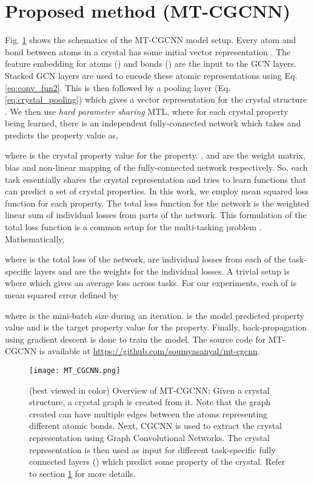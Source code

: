\documentclass{article}
\newcommand{\method}[1]{MT-CGCNN}
\newcommand{\baseline}[1]{CGCNN}
\begin{document}
 \section{Proposed method (MT-CGCNN)}
\label{sec:method}

Fig. \ref{fig:method} shows the schematics of the MT-CGCNN model setup. Every atom and bond between atoms in a crystal has some initial vector representation \citep{CGCNN}. The feature embedding for atoms () and bonds () are the input to the GCN layers. Stacked GCN layers are used to encode these atomic representations using Eq. \ref{eq:conv_fun2}. This is then followed by a pooling layer (Eq. \ref{eq:crystal_pooling}) which gives a vector representation for the crystal structure . We then use \textit{hard parameter sharing} MTL, where for each crystal property  being learned, there is an independent fully-connected network which takes  and predicts the property value as,


      
where  is the crystal property value for the  property. ,  and  are the weight matrix, bias and non-linear mapping of the  fully-connected network respectively. So, each task essentially shares the crystal representation  and tries to learn functions that can predict a set of crystal properties. In this work, we employ mean squared loss function for each property. The total loss function for the network is the weighted linear sum of individual losses from parts of the network. This formulation of the total loss function is a common setup for the multi-tasking problem \citep{Gradnorm17, KendallGC17}. Mathematically,


      
where  is the total loss of the network,  are individual losses from each of the task-specific layers and  are the weights for the individual losses. A trivial setup is where  which gives an average loss across tasks. For our experiments, each of  is mean squared error defined by

where  is the mini-batch size during an iteration.  is the model predicted property value and  is the target property value for the  property. Finally, back-propagation using gradient descent \citep{Rumelhart1988} is done to train the model. The source code for \method{} is available at \href{https://github.com/soumyasanyal/mt-cgcnn}{https://github.com/soumyasanyal/mt-cgcnn}.

\begin{figure}[htp]

\centering
\texttt{[image: MT\_CGCNN.png]}

\caption{(best viewed in color) Overview of \method{}: Given a crystal structure, a crystal graph is created from it. Note that the graph created can have multiple edges between the atoms representing different atomic bonds. Next, \baseline{} is used to extract the crystal representation using Graph Convolutional Networks. The crystal representation is then used as input for different task-specific fully connected layers () which predict some property of the crystal. Refer to section \ref{sec:method} for more details.}
\label{fig:method}

\end{figure}
\end{document}

